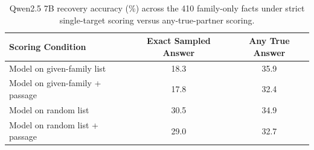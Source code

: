\begin{table}[h]
\centering
\small
\setlength{\tabcolsep}{3pt}
\begin{tabular}{lcc}
\toprule
Scoring Condition & Exact Sampled Answer & Any True Answer \\
\midrule
Model on given-family list & 18.3 & 35.9 \\
Model on given-family + passage & 17.8 & 32.4 \\
Model on random list & 30.5 & 34.9 \\
Model on random list + passage & 29.0 & 32.7 \\
\bottomrule
\end{tabular}
\caption{Qwen2.5 7B recovery accuracy (\%) across the 410 family-only facts under strict single-target scoring versus any-true-partner scoring.}
\label{tab:scoring}
\end{table}